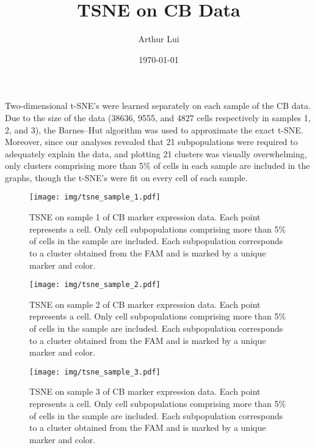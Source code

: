 \documentclass[12pt]{article} %
\title{TSNE on CB Data}
\author{Arthur Lui}
\date{\today} %
\begin{document}
\maketitle

Two-dimensional t-SNE's were learned separately on each sample of the CB data.
Due to the size of the data (38636, 9555, and 4827 cells respectively 
in samples 1, 2, and 3), the Barnes--Hut algorithm was used to approximate
the exact t-SNE. Moreover, since our analyses revealed that 21 subpopulations
were required to adequately explain the data, and plotting 21 clusters 
was visually overwhelming, only clusters comprising more than 
5\% of cells in each sample are included in the graphs, though
the t-SNE's were fit on every cell of each sample.


\begin{figure}[t]
  \begin{center}
    \texttt{[image: img/tsne\_sample\_1.pdf]}
  \end{center}
  \caption{TSNE on sample 1 of CB marker expression data. 
  Each point represents a cell. Only cell subpopulations comprising more
  than 5\% of cells in the sample are included. Each subpopulation
  corresponds to a cluster obtained from the FAM and is marked by a
  unique marker and color.}
\end{figure}


\begin{figure}[t]
  \begin{center}
    \texttt{[image: img/tsne\_sample\_2.pdf]} \\
  \end{center}
  \caption{TSNE on sample 2 of CB marker expression data. 
  Each point represents a cell. Only cell subpopulations comprising more
  than 5\% of cells in the sample are included. Each subpopulation
  corresponds to a cluster obtained from the FAM and is marked by a
  unique marker and color.}
\end{figure}


\begin{figure}[t]
  \begin{center}
    \texttt{[image: img/tsne\_sample\_3.pdf]} \\
  \end{center}
  \caption{TSNE on sample 3 of CB marker expression data. 
  Each point represents a cell. Only cell subpopulations comprising more
  than 5\% of cells in the sample are included. Each subpopulation
  corresponds to a cluster obtained from the FAM and is marked by a
  unique marker and color.}
\end{figure}


% 
\end{document}
